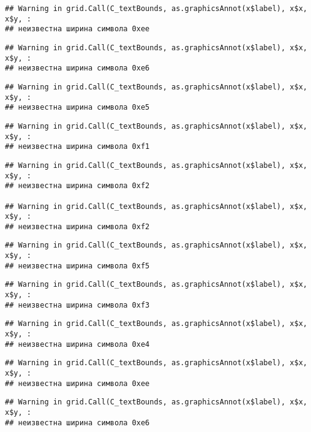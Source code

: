 \documentclass[
]{article}
\begin{document}
\begin{verbatim}
## Warning in grid.Call(C_textBounds, as.graphicsAnnot(x$label), x$x, x$y, :
## неизвестна ширина символа 0xee
\end{verbatim}

\begin{verbatim}
## Warning in grid.Call(C_textBounds, as.graphicsAnnot(x$label), x$x, x$y, :
## неизвестна ширина символа 0xe6
\end{verbatim}

\begin{verbatim}
## Warning in grid.Call(C_textBounds, as.graphicsAnnot(x$label), x$x, x$y, :
## неизвестна ширина символа 0xe5
\end{verbatim}

\begin{verbatim}
## Warning in grid.Call(C_textBounds, as.graphicsAnnot(x$label), x$x, x$y, :
## неизвестна ширина символа 0xf1
\end{verbatim}

\begin{verbatim}
## Warning in grid.Call(C_textBounds, as.graphicsAnnot(x$label), x$x, x$y, :
## неизвестна ширина символа 0xf2

## Warning in grid.Call(C_textBounds, as.graphicsAnnot(x$label), x$x, x$y, :
## неизвестна ширина символа 0xf2
\end{verbatim}

\begin{verbatim}
## Warning in grid.Call(C_textBounds, as.graphicsAnnot(x$label), x$x, x$y, :
## неизвестна ширина символа 0xf5
\end{verbatim}

\begin{verbatim}
## Warning in grid.Call(C_textBounds, as.graphicsAnnot(x$label), x$x, x$y, :
## неизвестна ширина символа 0xf3
\end{verbatim}

\begin{verbatim}
## Warning in grid.Call(C_textBounds, as.graphicsAnnot(x$label), x$x, x$y, :
## неизвестна ширина символа 0xe4
\end{verbatim}

\begin{verbatim}
## Warning in grid.Call(C_textBounds, as.graphicsAnnot(x$label), x$x, x$y, :
## неизвестна ширина символа 0xee
\end{verbatim}

\begin{verbatim}
## Warning in grid.Call(C_textBounds, as.graphicsAnnot(x$label), x$x, x$y, :
## неизвестна ширина символа 0xe6
\end{verbatim}
\end{document}
